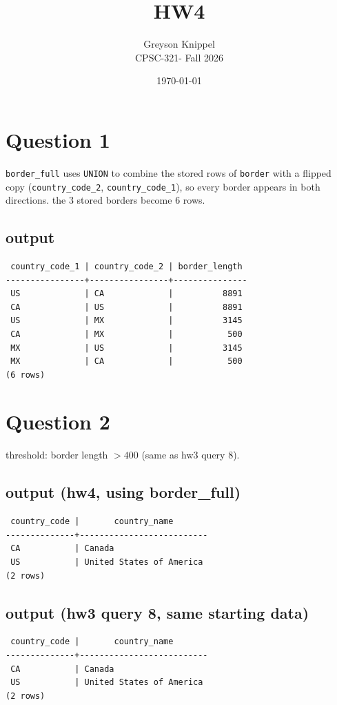 \documentclass[11pt]{article}
\title{HW4}
\author{
Greyson Knippel \\[4pt]
CPSC-321- Fall 2026\\[4pt]
}
\date{\today}
\begin{document}
\maketitle

\section*{Question 1}

\texttt{border\_full} uses \texttt{UNION} to combine the stored rows of \texttt{border} with a
flipped copy (\texttt{country\_code\_2}, \texttt{country\_code\_1}), so every border appears in
both directions. the 3 stored borders become 6 rows.

\subsection*{output}
{\small
\begin{verbatim}
 country_code_1 | country_code_2 | border_length
----------------+----------------+---------------
 US             | CA             |          8891
 CA             | US             |          8891
 US             | MX             |          3145
 CA             | MX             |           500
 MX             | US             |          3145
 MX             | CA             |           500
(6 rows)
\end{verbatim}
}

\section*{Question 2}

threshold: border length $> 400$ (same as hw3 query 8).

\subsection*{output (hw4, using border\_full)}
{\small
\begin{verbatim}
 country_code |       country_name
--------------+--------------------------
 CA           | Canada
 US           | United States of America
(2 rows)
\end{verbatim}
}

\subsection*{output (hw3 query 8, same starting data)}
{\small
\begin{verbatim}
 country_code |       country_name
--------------+--------------------------
 CA           | Canada
 US           | United States of America
(2 rows)
\end{verbatim}
}
\end{document}
